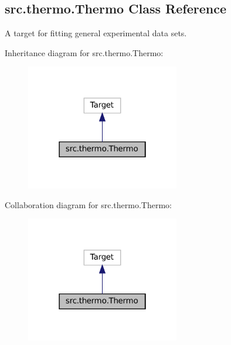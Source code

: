 \hypertarget{classsrc_1_1thermo_1_1Thermo}{}\subsection{src.\+thermo.\+Thermo Class Reference}
\label{classsrc_1_1thermo_1_1Thermo}


A target for fitting general experimental data sets.  




Inheritance diagram for src.\+thermo.\+Thermo\+:
\nopagebreak
\begin{figure}[H]
\begin{center}
\leavevmode
\includegraphics[width=190pt]{classsrc_1_1thermo_1_1Thermo__inherit__graph}
\end{center}
\end{figure}


Collaboration diagram for src.\+thermo.\+Thermo\+:
\nopagebreak
\begin{figure}[H]
\begin{center}
\leavevmode
\includegraphics[width=190pt]{classsrc_1_1thermo_1_1Thermo__coll__graph}
\end{center}
\end{figure}
